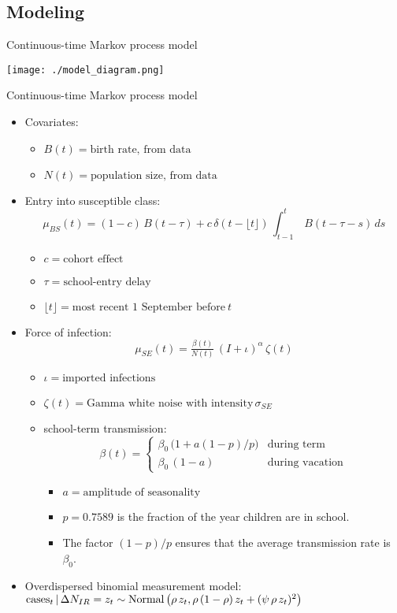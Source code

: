 \subsection{Modeling}

\begin{frame}{Continuous-time Markov process model}

  \begin{center}
    \texttt{[image: ./model\_diagram.png]}
  \end{center}
\end{frame}

\begin{frame}[allowframebreaks]{Continuous-time Markov process model}
  \begin{itemize}
  \item Covariates:
    \begin{itemize}
    \item $B(t) = \text{birth rate, from data}$
    \item $N(t) = \text{population size, from data}$
    \end{itemize}

  \item Entry into susceptible class:
    $$\mu_{BS}(t) = (1-c)\,B(t-\tau)+c\,\delta(t-\lfloor t\rfloor)\,\int_{t-1}^{t}\,B(t-\tau-s)\,ds$$
    \begin{itemize}
    \item $c = \text{cohort effect}$
    \item $\tau = \text{school-entry delay}$
    \item $\lfloor t \rfloor = \text{most recent 1 September before}\ t$
    \end{itemize}
  \item Force of infection:
    $$\mu_{SE}(t) = \tfrac{\beta(t)}{N(t)}\,(I+\iota)^{\alpha}\,\zeta(t)$$
    \begin{itemize}
    \item $\iota = \text{imported infections}$
    \item $\zeta(t) = \text{Gamma white noise with intensity}\,\sigma_{SE}$ \citep{He2010,Bhadra2011}
    \item school-term transmission:
      $$\beta(t) = \begin{cases}\beta_0\,\big(1+a(1-p)/p\big) &\text{during term}\\\beta_0\,(1-a) &\text{during vacation}\end{cases}$$
      \begin{itemize}
      \item $a= \text{amplitude of seasonality}$
      \item $p=0.7589$ is the fraction of the year children are in school.
      \item The factor $(1-p)/p$ ensures that the average transmission rate is $\beta_0$.
      \end{itemize}
    \end{itemize}
  \item Overdispersed binomial measurement model: $\mathrm{cases}_t\,\vert\,\Delta{N}_{IR}=z_t \sim \mathrm{Normal}\left(\rho\,z_t,\rho\,(1-\rho)\,z_t+(\psi\,\rho\,z_t)^2\right)$
  \end{itemize}
\end{frame}

